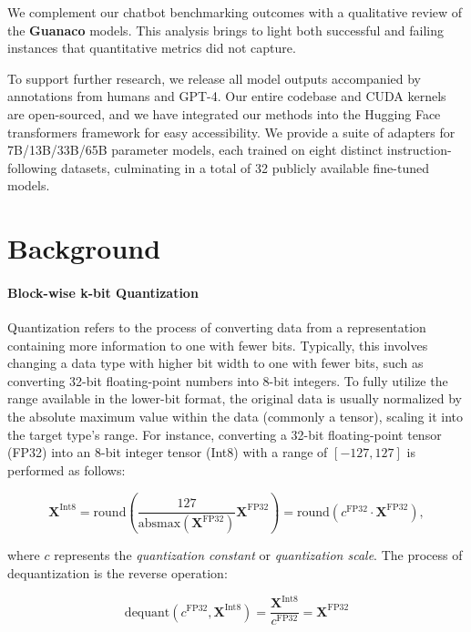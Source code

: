 We complement our chatbot benchmarking outcomes with a qualitative review of the \textbf{Guanaco} models. This analysis brings to light both successful and failing instances that quantitative metrics did not capture.

To support further research, we release all model outputs accompanied by annotations from humans and GPT-4. Our entire codebase and CUDA kernels are open-sourced, and we have integrated our methods into the Hugging Face transformers framework \citep{wolf2019huggingface} for easy accessibility. We provide a suite of adapters for 7B/13B/33B/65B parameter models, each trained on eight distinct instruction-following datasets, culminating in a total of 32 publicly available fine-tuned models.

\section{Background}
\paragraph{Block-wise k-bit Quantization} Quantization refers to the process of converting data from a representation containing more information to one with fewer bits. Typically, this involves changing a data type with higher bit width to one with fewer bits, such as converting 32-bit floating-point numbers into 8-bit integers. To fully utilize the range available in the lower-bit format, the original data is usually normalized by the absolute maximum value within the data (commonly a tensor), scaling it into the target type’s range. For instance, converting a 32-bit floating-point tensor (FP32) into an 8-bit integer tensor (Int8) with a range of $[-127, 127]$ is performed as follows:

\begin{equation}
    \mathbf{X}^{ \text{Int8}} = \text{round}\left( \frac{127}{{\text{absmax}}(\mathbf{X}^{{\text{FP32}}})}\mathbf{X}^{{\text{FP32}}} \right) = \text{round}(c^{\text{FP32}}\cdot \mathbf{X}^{{\text{FP32}}}),
\end{equation}

where $c$ represents the {\em quantization constant} or {\em quantization scale}. The process of dequantization is the reverse operation:

\begin{equation}
    \text{dequant}(c^{\text{FP32}}, \mathbf{X}^{\text{Int8}}) = \frac{\mathbf{X}^{\text{Int8}}}{c^{\text{FP32}}} = \mathbf{X}^{\text{FP32}}
\end{equation}

